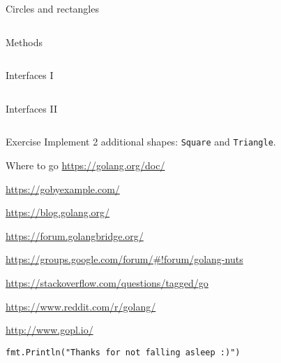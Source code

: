 \documentclass[10pt]{beamer}
\begin{document}
	
	\begin{frame}[t,fragile]{Circles and rectangles}
		\inputminted[fontsize=\scriptsize]{go}{code/15_shapes.go}
	\end{frame}
	
	
	\begin{frame}[t,fragile]{Methods}
		\inputminted[fontsize=\scriptsize]{go}{code/16_methods.go}
	\end{frame}
	
	
	\begin{frame}[t,fragile]{Interfaces I}
		\inputminted[fontsize=\scriptsize]{go}{code/17_interfaces.go}
	\end{frame}
	
	
	\begin{frame}[t,fragile]{Interfaces II}
		\inputminted[fontsize=\scriptsize,firstnumber=last]{go}{code/17b_interfaces.go}
	\end{frame}
	
	
	\begin{frame}[fragile]{Exercise}
		Implement 2 additional shapes: \texttt{Square} and \texttt{Triangle}.
	\end{frame}
	
	
	\begin{frame}[fragile]{Where to go}
		\href{https://golang.org/doc/}{https://golang.org/doc/}
		
		\href{https://gobyexample.com/}{https://gobyexample.com/}
		
		\href{https://blog.golang.org/}{https://blog.golang.org/}
		
		\href{https://forum.golangbridge.org/}{https://forum.golangbridge.org/}
		
		\href{https://groups.google.com/forum/#!forum/golang-nuts}{https://groups.google.com/forum/\#!forum/golang-nuts}
		
		\href{https://stackoverflow.com/questions/tagged/go}{https://stackoverflow.com/questions/tagged/go}
		
		\href{https://www.reddit.com/r/golang/}{https://www.reddit.com/r/golang/}
		
		\href{http://www.gopl.io/}{http://www.gopl.io/}
	\end{frame}
									
	
	\begin{frame}[fragile]{}
		\begin{center}
			\texttt{fmt.Println("Thanks for not falling asleep :)")}
		\end{center}
	\end{frame}
\end{document}
